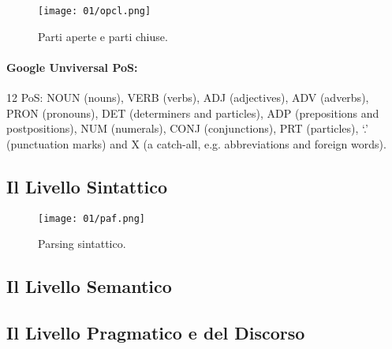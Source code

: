 

\begin{figure}[h]
    \centering
    \texttt{[image: 01/opcl.png]}
    \caption{Parti aperte e parti chiuse.}
\end{figure}

\paragraph{Google Unviversal PoS:} 12 PoS: NOUN (nouns), VERB (verbs), ADJ (adjectives), ADV (adverbs), PRON
(pronouns), DET (determiners and particles), ADP (prepositions and
postpositions), NUM (numerals), CONJ (conjunctions), PRT (particles), ‘.’
(punctuation marks) and X (a catch-all, e.g. abbreviations and foreign words). 

\subsection{Il Livello Sintattico}

\begin{figure}[h]
    \centering
    \texttt{[image: 01/paf.png]}
    \caption{Parsing sintattico.}
\end{figure}


\subsection{Il Livello Semantico}

\subsection{Il Livello Pragmatico e del Discorso}

